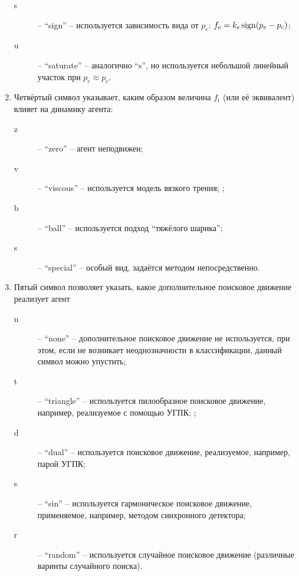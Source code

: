 \begin{enumerate}
\begin{description}
      \item[s] -- ``sign'' -- используется зависимость вида
        от $p_e$: $f_e = k_e \operatorname*{sign}( p_e - p_c )$;

      \item[u] -- ``saturate'' -- аналогично ``s'', но используется небольшой
        линейный участок при $p_e \approx p_c$.

    \end{description}


  \item
    Четвёртый символ указывает, каким образом величина $f_t$ (или её эквивалент) влияет на динамику агента:
    \begin{description}

      \item[z]  -- ``zero'' -- агент неподвижен;

      \item[v] -- ``viscous'' --  используется модель вязкого трения; ;

      \item[b] -- ``ball'' -- используется подход ``тяжёлого шарика'';

      \item[s] -- ``special'' -- особый вид, задаётся методом непосредственно.

    \end{description}

  \item
    Пятый символ позволяет указать, какое дополнительное поисковое движение
    реализует агент
    \begin{description}

      \item[n]  -- ``none'' -- дополнительное поисковое движение не используется,
        при этом, если не возникает неоднозначности в классификации, данный символ можно упустить;

      \item[t] -- ``triangle'' --  используется пилообразное поисковое движение, например, реализуемое
        с помощью УГПК; ;

      \item[d] -- ``dual'' -- используется поисковое движение, реализуемое, например, парой УГПК;

      \item[s] -- ``sin'' --  используется гармоническое поисковое движение, применяемое, например, методом синхронного детектора;

      \item[r] -- ``random'' --  используется случайное поисковое движение (различные варинты случайного поиска).


\end{description}
\end{enumerate}
